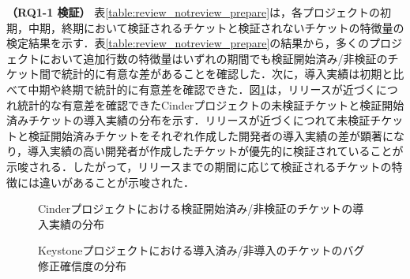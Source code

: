 \documentclass[T,J]{fose} %
\begin{document}
\textbf{（RQ1-1 検証）} 表\ref{table:review_notreview_prepare}は，各プロジェクトの初期，中期，終期において検証されるチケットと検証されないチケットの特徴量の検定結果を示す．表\ref{table:review_notreview_prepare}の結果から，多くのプロジェクトにおいて追加行数の特徴量はいずれの期間でも検証開始済み/非検証のチケット間で統計的に有意な差があることを確認した．次に，導入実績は初期と比べて中期や終期で統計的に有意差を確認できた．図\ref{fig:review_notreview}は，リリースが近づくにつれ統計的な有意差を確認できたCinderプロジェクトの未検証チケットと検証開始済みチケットの導入実績の分布を示す．リリースが近づくにつれて未検証チケットと検証開始済みチケットをそれぞれ作成した開発者の導入実績の差が顕著になり，導入実績の高い開発者が作成したチケットが優先的に検証されていることが示唆される．したがって，リリースまでの期間に応じて検証されるチケットの特徴には違いがあることが示唆された．


\begin{figure}[t]
\begin{center}
\caption{Cinderプロジェクトにおける検証開始済み/非検証のチケットの導入実績の分布}
\label{fig:review_notreview}
\end{center}
\end{figure}

\begin{figure}[t]
\begin{center}
\caption{Keystoneプロジェクトにおける導入済み/非導入のチケットのバグ修正確信度の分布}
\label{fig:merge_notmerge}
\end{center}
\end{figure}
\end{document}
